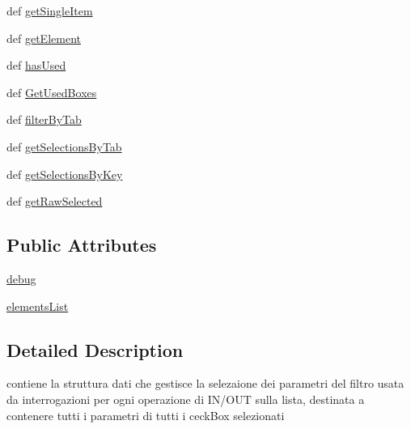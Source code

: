 \begin{DoxyCompactItemize}
def \hyperlink{classmmasgis_1_1interrogazioni_1_1ListManager_a6b2e352e278a8f50e6f60b3bd42a65e6}{getSingleItem}
\item 
def \hyperlink{classmmasgis_1_1interrogazioni_1_1ListManager_a66d7f1d96b01c5609fb8590db1cbb7e3}{getElement}
\item 
def \hyperlink{classmmasgis_1_1interrogazioni_1_1ListManager_a598cdcc0fcaf4605b7bd95df9c2c21b0}{hasUsed}
\item 
def \hyperlink{classmmasgis_1_1interrogazioni_1_1ListManager_ad3dac27be4ba96eb3ab9e6fac7958817}{GetUsedBoxes}
\item 
def \hyperlink{classmmasgis_1_1interrogazioni_1_1ListManager_ab96c00d487450c5d4ad92e51b4b335d2}{filterByTab}
\item 
def \hyperlink{classmmasgis_1_1interrogazioni_1_1ListManager_adec50addfd4cf0f5cfc5b4023a3bf4fb}{getSelectionsByTab}
\item 
def \hyperlink{classmmasgis_1_1interrogazioni_1_1ListManager_a50f4e96c195bd8d2d2cbfd5036638ab9}{getSelectionsByKey}
\item 
def \hyperlink{classmmasgis_1_1interrogazioni_1_1ListManager_a56d2d15ad465efeaca2ccffee8d3efd9}{getRawSelected}
\end{DoxyCompactItemize}
\subsection*{Public Attributes}
\begin{DoxyCompactItemize}
\item 
\hyperlink{classmmasgis_1_1interrogazioni_1_1ListManager_a5c7b3b5bbc68bdd606f6001ecb1ad393}{debug}
\item 
\hyperlink{classmmasgis_1_1interrogazioni_1_1ListManager_acb5c5a96fb65dbff0e3efbfa4fbb937a}{elementsList}
\end{DoxyCompactItemize}


\subsection{Detailed Description}
\begin{DoxyVerb}
contiene la struttura dati che gestisce la selezaione dei parametri del filtro
usata  da interrogazioni per ogni operazione  di IN/OUT sulla lista, destinata a contenere tutti i parametri di tutti i ceckBox selezionati
\end{DoxyVerb}
 


